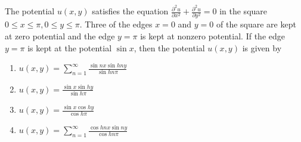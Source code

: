 \item The potential $u(x,y)$ satisfies the equation $\frac{\partial^2 u}{\partial x^2}+\frac{\partial^2 u}{\partial y^2}=0$ in the square $0 \leq x \leq \pi, 0\leq y \leq \pi.$ Three of the edges $x=0$ and $y=0$ of the square are kept at zero potential and the edge $y=\pi$ is kept at nonzero potential. If the edge $y=\pi$ is kept at the potential $\sin x$, then the potential $u(x,y)$ is given by 
\begin{enumerate}
    \item$u(x,y)=\sum_{n=1}^\infty \frac{\sin nx \sin h ny}{\sin h n \pi}$
    \item$u(x,y)=\frac{\sin x \sin h y}{\sin h \pi}$
    \item$u(x,y)=\frac{\sin x \cos h y}{\cos h \pi}$
    \item$u(x,y)=\sum_{n=1}^\infty \frac{\cos hnx \sin ny}{\cos h n \pi}$
\end{enumerate}